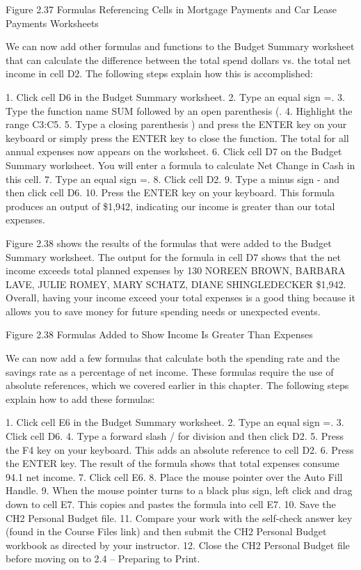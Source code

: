 Figure 2.37 Formulas Referencing Cells in Mortgage Payments and Car Lease Payments Worksheets


We can now add other formulas and functions to the Budget Summary worksheet that can calculate
the difference between the total spend dollars vs. the total net income in cell D2. The following steps
explain how this is accomplished:

1.   Click cell D6 in the Budget Summary worksheet.
2.   Type an equal sign =.
3.   Type the function name SUM followed by an open parenthesis (.
4.   Highlight the range C3:C5.
5.   Type a closing parenthesis ) and press the ENTER key on your keyboard or simply press the
ENTER key to close the function. The total for all annual expenses now appears on the
worksheet.
6.   Click cell D7 on the Budget Summary worksheet. You will enter a formula to calculate Net
Change in Cash in this cell.
7.   Type an equal sign =.
8.   Click cell D2.
9.   Type a minus sign - and then click cell D6.
10.   Press the ENTER key on your keyboard. This formula produces an output of \$1,942, indicating
our income is greater than our total expenses.

Figure 2.38 shows the results of the formulas that were added to the Budget Summary worksheet.
The output for the formula in cell D7 shows that the net income exceeds total planned expenses by
130 NOREEN BROWN, BARBARA LAVE, JULIE ROMEY, MARY SCHATZ, DIANE SHINGLEDECKER
\$1,942. Overall, having your income exceed your total expenses is a good thing because it allows you
to save money for future spending needs or unexpected events.




Figure 2.38 Formulas Added to Show Income Is Greater Than Expenses


We can now add a few formulas that calculate both the spending rate and the savings rate as a
percentage of net income. These formulas require the use of absolute references, which we covered
earlier in this chapter. The following steps explain how to add these formulas:

1.   Click cell E6 in the Budget Summary worksheet.
2.   Type an equal sign =.
3.   Click cell D6.
4.   Type a forward slash / for division and then click D2.
5.   Press the F4 key on your keyboard. This adds an absolute reference to cell D2.
6.   Press the ENTER key. The result of the formula shows that total expenses consume 94.1%
net income.
7.   Click cell E6.
8.   Place the mouse pointer over the Auto Fill Handle.
9.   When the mouse pointer turns to a black plus sign, left click and drag down to cell E7. This
copies and pastes the formula into cell E7.
10.   Save the CH2 Personal Budget file.
11.   Compare your work with the self-check answer key (found in the Course Files link) and then
submit the CH2 Personal Budget workbook as directed by your instructor.
12.   Close the CH2 Personal Budget file before moving on to 2.4 – Preparing to Print.

